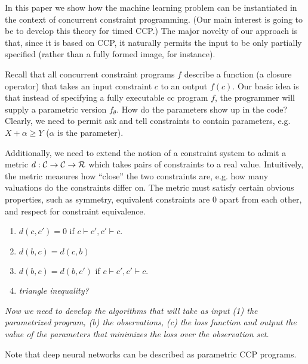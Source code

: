\documentclass{llncs}
\begin{document}
In this paper we show how the machine learning problem can be
instantiated in the context of concurrent constraint programming.
(Our main interest is going to be to develop this theory for timed
CCP.) The major novelty of our approach is that, since it is based on
CCP, it naturally permits the input to be only partially specified
(rather than a fully formed image, for instance). 

Recall that all concurrent constraint programs $f$ describe
a function (a closure operator) that takes an input constraint $c$ to
an output $f(c)$.  Our basic idea is that instead of specifying a
fully executable cc program $f$, the programmer will supply a parametric version
$f_{\theta}$. How do the parameters show up in the code? Clearly, we
need to permit ask and tell constraints to contain parameters,
e.g. $X + \alpha \geq Y$ ($\alpha$ is the parameter). 

Additionally, we need to extend the notion of a constraint system to
admit a metric  $d: {\cal C} \rightarrow {\cal C} \rightarrow {\cal
  R}$ which takes pairs of constraints to a real value. Intuitively,
the metric measures how ``close'' the two constraints are, e.g.{} how
many valuations do the constraints differ on. 
The metric must satisfy certain obvious properties, such as symmetry,
equivalent constraints are $0$ apart from each other, and respect for
constraint equivalence. 
\begin{enumerate}
\item $d(c,c')=0$ if $c \vdash c', c' \vdash c$.
\item $d(b,c)=d(c,b)$
\item $d(b,c)=d(b,c')$ if $c \vdash c', c' \vdash c$.
\item {\em triangle inequality?}
\end{enumerate}

{\em Now we need to develop the algorithms that will take as input (1)
  the parametrized program, (b) the observations, (c) the loss
  function and output the value of the parameters that minimizes the
  loss over the observation set.}

Note that deep neural networks can be described as parametric CCP
programs. 

\newpage


%
\end{document}
